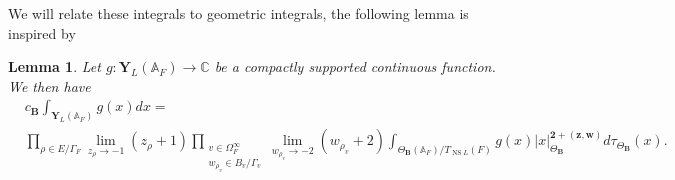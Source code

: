 \documentclass[a4paper,11pt,reqno]{amsart}
\newcommand{\C}{\mathbb{C}}
\newcommand{\A}{\mathbb{A}}
\DeclareMathOperator{\NS}{NS}
\newtheorem{lemma}[theorem]{Lemma}
\theoremstyle{definition}
\begin{document}
We will relate these integrals to geometric integrals, the following lemma is inspired by \cite[Prop.~4.10]{Chambert-Loir2010Igusa}
\begin{lemma}\label{lem:Limit is geometric integral}
	Let $g: \mathbf{Y}_L(\A_F) \to \C$ be a compactly supported continuous function. We then have
	\[
	\begin{split}
		&c_{\mathbf{B}} \int_{\mathbf{Y}_L(\A_F)} g(x) dx = \\ 
		&\prod_{\rho \in E / \Gamma_F} \lim_{z_{\rho} \to -1}(z_{\rho} + 1) \prod_{\substack{v \in \Omega_{F}^{\infty} \\ w_{\rho_v} \in B_v / \Gamma_v}} \lim_{w_{\rho_v} \to - 2}(w_{\rho_v} + 2) \int_{\Theta_{\mathbf{B}}(\A_F)/T_{\NS L}(F)} g(x) |x|_{\Theta_{\mathbf{B}}}^{\mathbf{2} + (\bm{z}, \bm{w})} d \tau_{\Theta_{\mathbf{B}}}(x).
	\end{split}
	\]
\end{lemma}
\end{document}
